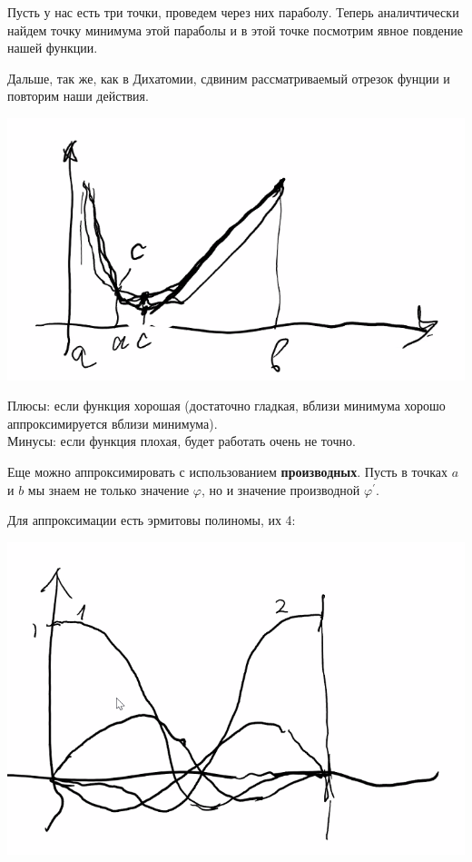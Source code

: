 Пусть у нас есть три точки, проведем через них параболу.
Теперь аналичтически найдем точку минимума этой параболы и в этой точке посмотрим явное повдение нашей функции.

Дальше, так же, как в Дихатомии, сдвиним рассматриваемый отрезок фунции и повторим наши действия.

\begin{center}
    \includegraphics[scale=0.7]{img/methopt_one_dimensional_optimization_polynomial_approx}
\end{center}

Плюсы: если функция хорошая (достаточно гладкая, вблизи минимума хорошо аппроксимируется вблизи минимума).\\
Минусы: если функция плохая, будет работать очень не точно.

Еще можно аппроксимировать с использованием \textbf{производных}.
Пусть в точках $a$ и $b$ мы знаем не только значение $\varphi$, но и значение производной $\varphi^\prime$.

Для аппроксимации есть эрмитовы полиномы, их 4:
\begin{center}
    \includegraphics[scale=0.4]{img/methopt_one_dimensional_optimization_ermyt_polynom}
\end{center}

